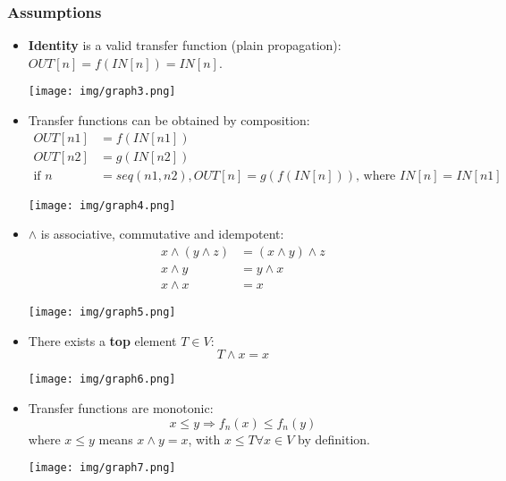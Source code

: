 \documentclass[a4paper, 10pt, titlepage]{article}
\begin{document}
\subsubsection{Assumptions}
\begin{itemize}
\item \textbf{Identity} is a valid transfer function (plain propagation): $OUT[n] = f(IN[n]) = IN[n]$.
\begin{center}
\texttt{[image: img/graph3.png]}
\end{center}

\item Transfer functions can be obtained by composition:
\begin{align*}
OUT[n1] &= f(IN[n1]) \\
OUT[n2] &= g(IN[n2]) \\
\text{if }n &= seq(n1, n2), OUT[n] = g(f(IN[n]))\text{, where } IN[n] = IN[n1]
\end{align*}
\vspace*{-5mm}
\begin{center}
\texttt{[image: img/graph4.png]}
\end{center}

\item $\wedge$ is associative, commutative and idempotent:
\begin{align*}
x \wedge (y \wedge z) &= (x \wedge y) \wedge z \\
x \wedge y &= y \wedge x \\
x \wedge x &= x
\end{align*}
\vspace*{-5mm}
\begin{center}
\texttt{[image: img/graph5.png]}
\end{center}

\item There exists a \textbf{top} element $T \in V$:
$$T \wedge x = x$$
\vspace*{-5mm}
\begin{center}
\texttt{[image: img/graph6.png]}
\end{center}

\item Transfer functions are monotonic:
$$x \leq y \Rightarrow f_n(x) \leq f_n(y)$$
where $x \leq y$ means $x \wedge y = x$, with $x \leq T \forall x \in V$ by definition.
\begin{center}
\texttt{[image: img/graph7.png]}
\end{center}

\end{itemize}
\end{document}
